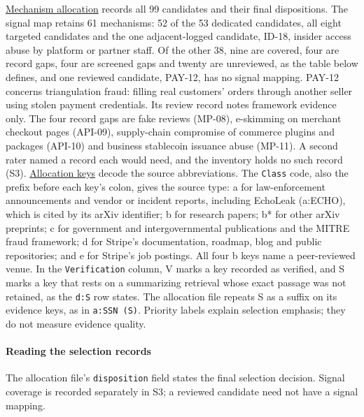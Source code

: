 \documentclass[
  11pt,
]{article}
\begin{document}
\href{SUPPLEMENT/S2_MECHANISM_ALLOCATION.csv}{Mechanism allocation}
records all 99 candidates and their final dispositions. The signal map
retains 61 mechanisms: 52 of the 53 dedicated candidates, all eight
targeted candidates and the one adjacent-logged candidate, \mbox{ID-18},
insider access abuse by platform or partner staff. Of the other 38, nine
are covered, four are record gaps, four are screened gaps and twenty are
unreviewed, as the table below defines, and one reviewed candidate,
\mbox{PAY-12}, has no signal mapping. \mbox{PAY-12} concerns
triangulation fraud: filling real customers' orders through another
seller using stolen payment credentials. Its review record notes
framework evidence only. The four record gaps are fake reviews
(\mbox{MP-08}), e-skimming on merchant checkout pages (\mbox{API-09}),
supply-chain compromise of commerce plugins and packages (\mbox{API-10})
and business stablecoin issuance abuse (\mbox{MP-11}). A second rater
named a record each would need, and the inventory holds no such record
(S3). \href{SUPPLEMENT/S2_ALLOCATION_KEYS.csv}{Allocation keys} decode
the source abbreviations. The \texttt{Class} code, also the prefix
before each key's colon, gives the source type: a for law-enforcement
announcements and vendor or incident reports, including EchoLeak
(a:ECHO), which is cited by its arXiv identifier; b for research papers;
b* for other arXiv preprints; c for government and intergovernmental
publications and the MITRE fraud framework; d for Stripe's
documentation, roadmap, blog and public repositories; and e for Stripe's
job postings. All four b keys name a peer-reviewed venue. In the
\texttt{Verification} column, V marks a key recorded as verified, and S
marks a key that rests on a summarizing retrieval whose exact passage
was not retained, as the \texttt{d:S} row states. The allocation file
repeats S as a suffix on its evidence keys, as in
\mbox{\texttt{a:SSN\ (S)}}. Priority labels explain selection emphasis;
they do not measure evidence quality.

\hypertarget{reading-the-selection-records}{%
\paragraph{Reading the selection
records}\label{reading-the-selection-records}}

The allocation file's \texttt{disposition} field states the final
selection decision. Signal coverage is recorded separately in S3; a
reviewed candidate need not have a signal mapping.
\end{document}
